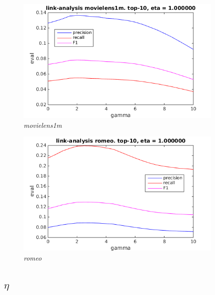 \begin{figure}[h!]
  \centering
    \includegraphics[width=0.9\textwidth]{fig/link_gamma/movielens_link_gamma.png}
    \caption{\textit{movielens1m}}
    \vspace{-10pt}
\end{figure}

\begin{figure}[h!]
  \centering
    \includegraphics[width=0.9\textwidth]{fig/link_gamma/romeo_link_gamma.png}
    \caption{\textit{romeo}}
    \vspace{-10pt}
\end{figure}

\FloatBarrier


\newpage
\subsection{$\eta$}

\FloatBarrier

